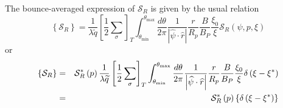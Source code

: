 The bounce-averaged expression of $\mathcal{S}_{R}$ is given by the usual
relation
\begin{equation}
\left\{ \mathcal{S}_{R}\right\} =\frac{1}{\lambda \widetilde{q}}\left[ \frac{
1}{2}\sum_{\sigma }\right] _{T}\int_{\theta _{\min }}^{\theta _{\max }}\frac{
d\theta }{2\pi }\frac{1}{\left| \widehat{\psi }\cdot \widehat{r}\right| }%
\frac{r}{R_{p}}\frac{B}{B_{P}}\frac{\xi _{0}}{\xi }\mathcal{S}_{R}\left(
\psi ,p,\xi \right)
\end{equation}
or
\begin{eqnarray}
\left\{ \mathcal{S}_{R}\right\} &=&\mathcal{S}_{R}^{*}\left( p\right) \frac{1%
}{\lambda \widetilde{q}}\left[ \frac{1}{2}\sum_{\sigma }\right]
_{T}\int_{\theta _{\min }}^{\theta _{\max }}\frac{d\theta }{2\pi }\frac{1}{%
\left| \widehat{\psi }\cdot \widehat{r}\right| }\frac{r}{R_{p}}\frac{B}{B_{P}%
}\frac{\xi _{0}}{\xi }\delta \left( \xi -\xi ^{*}\right)  \nonumber \\
&=&\mathcal{S}_{R}^{*}\left( p\right) \left\{ \delta \left( \xi -\xi
^{*}\right) \right\}
\end{eqnarray}

